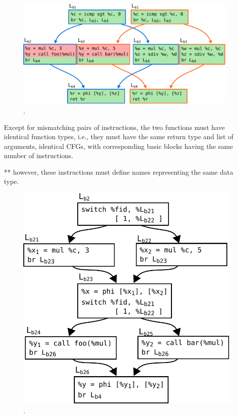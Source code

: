 \begin{figure}[h]
  \centering
  \includegraphics[width=0.98\textwidth]{src/fastfm/figs/soa-example-1.pdf}
  \caption{.}
  \label{fig:soa-example-1}
\end{figure}

Except for mismatching pairs of instructions, the two functions must have identical function types, i.e., they must have the same return type and list of arguments, identical CFGs, with corresponding basic blocks having the same number of instructions.

** however, these instructions must define names representing the same data type.

\begin{figure}[h]
  \centering
  \includegraphics[scale=0.9]{src/fastfm/figs/soa-example-2.pdf}
  \caption{.}
  \label{fig:soa-example-2}
\end{figure}



